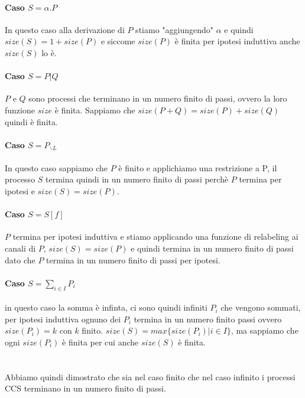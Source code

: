 \documentclass{article}
\newcommand{\pl}{P_{\backslash L}}
\begin{document}
\paragraph{Caso $S=\alpha .P$}
In questo caso alla derivazione di $P$ stiamo "aggiungendo" $\alpha$ e quindi $size(S)=1+size(P)$ e siccome $size(P)$ è finita per ipotesi induttiva anche $size(S)$ lo è.

\paragraph{Caso $S= P|Q$}
$P$ e $Q$ sono processi che terminano in un numero finito di passi, ovvero la loro funzione $size$ è finita. Sappiamo che $size(P+Q)=size(P)+size(Q)$ quindi è finita.

\paragraph{Caso $S=\pl$}
In questo caso sappiamo che $P$ è finito e applichiamo una restrizione a P, il processo $S$ termina quindi in un numero finito di passi perchè $P$ termina per ipotesi e $size(S)=size(P)$.

\paragraph{Caso $S=S[f]$}
$P$ termina per ipotesi induttiva e stiamo applicando una funzione di relabeling ai canali di $P$, $size(S)=size(P)$ e quindi termina in un numero finito di passi dato che $P$ termina in un numero finito di passi per ipotesi.

\paragraph{Caso $S= \sum_{i \in I}P_{i}$}
in questo caso la somma è infinta, ci sono quindi infiniti $P_{i}$ che vengono sommati, per ipotesi induttiva ognuno dei $P_{i}$ termina in un numero finito passi ovvero $size(P_{i})=k$ con $k$ finito. $size(S) = max\{size(P_{i})| i \in I\}$, ma sappiamo che ogni $size(P_{i})$ è finita per cui anche $size(S)$ è finita.\\\\\\

Abbiamo quindi dimostrato che sia nel caso finito che nel caso infinito i processi CCS terminano in un numero finito di passi.
\end{document}
